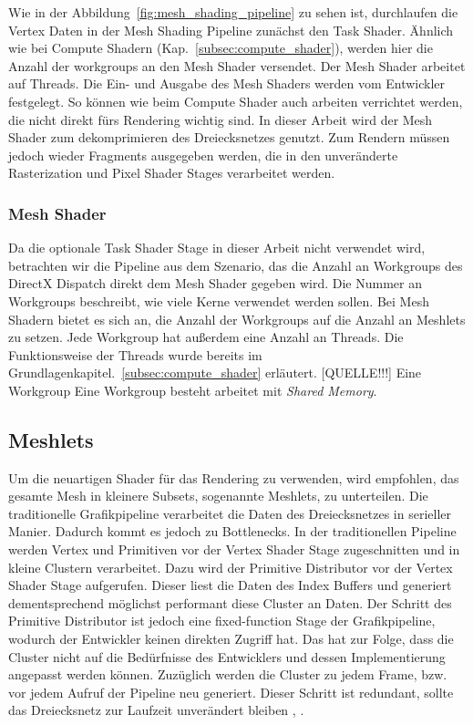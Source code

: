 Wie in der Abbildung~\ref{fig:mesh_shading_pipeline} zu sehen ist, durchlaufen die Vertex Daten in der Mesh Shading Pipeline zunächst den Task Shader.
Ähnlich wie bei Compute Shadern (Kap.~\ref{subsec:compute_shader}), werden hier die Anzahl der workgroups an den Mesh Shader versendet.
Der Mesh Shader arbeitet auf Threads.
Die Ein- und Ausgabe des Mesh Shaders werden vom Entwickler festgelegt.
So können wie beim Compute Shader auch arbeiten verrichtet werden, die nicht direkt fürs Rendering wichtig sind.
In dieser Arbeit wird der Mesh Shader zum dekomprimieren des Dreiecksnetzes genutzt.
Zum Rendern müssen jedoch wieder Fragments ausgegeben werden, die in den unveränderte Rasterization und Pixel Shader Stages verarbeitet werden. \cite{Kubisch2018}

\subsubsection*{Mesh Shader}
Da die optionale Task Shader Stage in dieser Arbeit nicht verwendet wird, betrachten wir die Pipeline aus dem Szenario, das die Anzahl an Workgroups des DirectX Dispatch direkt dem Mesh Shader gegeben wird.
Die Nummer an Workgroups beschreibt, wie viele Kerne verwendet werden sollen.
Bei Mesh Shadern bietet es sich an, die Anzahl der Workgroups auf die Anzahl an Meshlets zu setzen.
Jede Workgroup hat außerdem eine Anzahl an Threads.
Die Funktionsweise der Threads wurde bereits im Grundlagenkapitel.~\ref{subsec:compute_shader} erläutert. [QUELLE!!!]
Eine Workgroup 
Eine Workgroup besteht arbeitet mit \textit{Shared Memory}.

\subsection{Meshlets}
\label{subsec:meshlets}
Um die neuartigen Shader für das Rendering zu verwenden, wird empfohlen, das gesamte Mesh in kleinere Subsets, sogenannte Meshlets, zu unterteilen. 
Die traditionelle Grafikpipeline verarbeitet die Daten des Dreiecksnetzes in serieller Manier. 
Dadurch kommt es jedoch zu Bottlenecks.
In der traditionellen Pipeline werden Vertex und Primitiven vor der Vertex Shader Stage zugeschnitten und in kleine Clustern verarbeitet.
Dazu wird der Primitive Distributor vor der Vertex Shader Stage aufgerufen.
Dieser liest die Daten des Index Buffers und generiert dementsprechend möglichst performant diese Cluster an Daten.
Der Schritt des Primitive Distributor ist jedoch eine fixed-function Stage der Grafikpipeline, wodurch der Entwickler keinen direkten Zugriff hat.
Das hat zur Folge, dass die Cluster nicht auf die Bedürfnisse des Entwicklers und dessen Implementierung angepasst werden können.
Zuzüglich werden die Cluster zu jedem Frame, bzw. vor jedem Aufruf der Pipeline neu generiert.
Dieser Schritt ist redundant, sollte das Dreiecksnetz zur Laufzeit unverändert bleiben \cite{Carvalho2022}, \cite{Kubisch2018}. \newline

